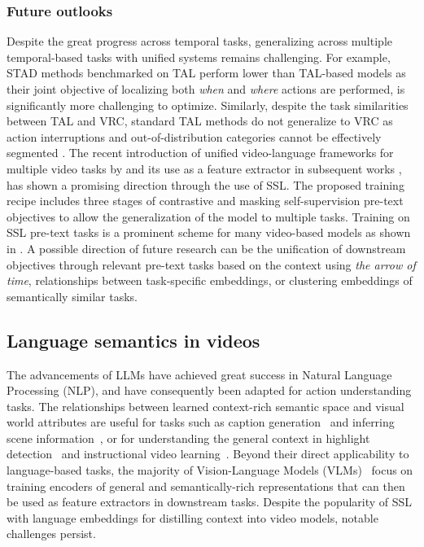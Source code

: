 \subsubsection{Future outlooks}

Despite the great progress across temporal tasks, generalizing across multiple temporal-based tasks with unified systems remains challenging. For example, STAD methods \citep{dai2021pdan,tirupattur2021modeling} benchmarked on TAL perform lower than TAL-based models as their joint objective of localizing both \emph{when} and \emph{where} actions are performed, is significantly more challenging to optimize. Similarly, despite the task similarities between TAL and VRC, standard TAL methods do not generalize to VRC as action interruptions and out-of-distribution categories cannot be effectively segmented \citep{hu2022transrac,sinha2024every}. The recent introduction of unified video-language frameworks for multiple video tasks by \citet{wang2024internvideo2} and its use as a feature extractor in subsequent works \citep{chen2024video}, has shown a promising direction through the use of SSL. The proposed training recipe includes three stages of contrastive and masking self-supervision pre-text objectives to allow the generalization of the model to multiple tasks. Training on SSL pre-text tasks is a prominent scheme for many video-based models as shown in . A possible direction of future research can be the unification of downstream objectives through relevant pre-text tasks based on the context using \emph{the arrow of time}, relationships between task-specific embeddings, or clustering embeddings of semantically similar tasks.     




\subsection{Language semantics in videos}
\label{sec:recognition::language}

The advancements of LLMs have achieved great success in Natural Language Processing (NLP), and have consequently been adapted for action understanding tasks. The relationships between learned context-rich semantic space and visual world attributes are useful for tasks such as caption generation~\citep{seo2022end,sun2019videobert,wang2024omnivid} and inferring scene information~\citep{anderson2018vision,cheng2024egothink}, or for understanding the general context in highlight detection~\citep{lei2021detecting} and instructional video learning~\citep{miech2020end}. Beyond their direct applicability to language-based tasks, the majority of Vision-Language Models (VLMs)~\citep{ashutosh2023hiervl,fu2021violet,kahatapitiya2024victr,song2024moviechat,xu2021videoclip,zellers2021merlot} focus on training encoders of general and semantically-rich representations that can then be used as feature extractors in downstream tasks. Despite the popularity of SSL with language embeddings for distilling context into video models, notable challenges persist. 

